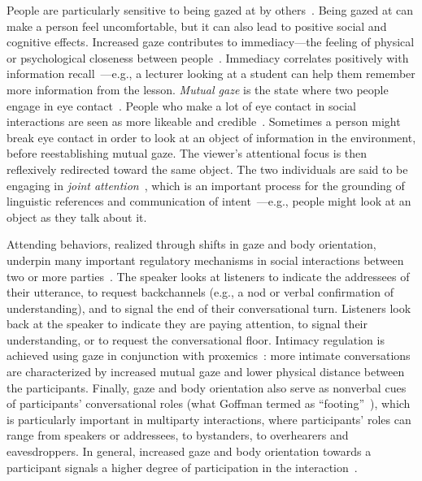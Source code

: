 People are particularly sensitive to being gazed at by others~\cite{argyle1976gaze}. Being gazed at can make a person feel uncomfortable, but it can also lead to positive social and cognitive effects. Increased gaze contributes to immediacy---the feeling of physical or psychological closeness between people~\cite{mehrabian1966immediacy}. Immediacy correlates positively with information recall~\cite{otteson1980effect,sherwood1987facilitative,fullwood2006effect,kelley1988effects}---e.g., a lecturer looking at a student can help them remember more information from the lesson.
\emph{Mutual gaze} is the state where two people engage in eye contact~\cite{argyle1976gaze}. People who make a lot of eye contact in social interactions are seen as more likeable and credible~\cite{beebe1976effects,argyle1976gaze}. Sometimes a person might break eye contact in order to look at an object of information in the environment, before reestablishing mutual gaze. The viewer's attentional focus is then reflexively redirected toward the same object. The two individuals are said to be engaging in \emph{joint attention}~\cite{dentremont2007early}, which is an important process for the grounding of linguistic references and communication of intent~\cite{Hanna and Brennan 2007, Preissler and Carey 2005,mumme2007actions}---e.g., people might look at an object as they talk about it.

Attending behaviors, realized through shifts in gaze and body orientation, underpin many important regulatory mechanisms in social interactions between two or more parties~\cite{heylen2006head}. The speaker looks at listeners to indicate the addressees of their utterance, to request backchannels (e.g., a nod or verbal confirmation of understanding), and to signal the end of their conversational turn. Listeners look back at the speaker to indicate they are paying attention, to signal their understanding, or to request the conversational floor. Intimacy regulation is achieved using gaze in conjunction with proxemics~\cite{argyle1965eyecontact}: more intimate conversations are characterized by increased mutual gaze and lower physical distance between the participants. Finally, gaze and body orientation also serve as nonverbal cues of participants' conversational roles (what Goffman termed as ``footing''~\cite{goffman1979footing}), which is particularly important in multiparty interactions, where participants' roles can range from speakers or addressees, to bystanders, to overhearers and eavesdroppers. In general, increased gaze and body orientation towards a participant signals a higher degree of participation in the interaction~\cite{mutlu2012conversational}.

